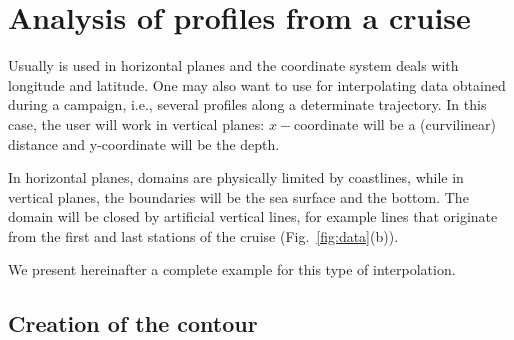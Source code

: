 

%
%








\section{Analysis of profiles from a cruise\label{sec:cruise}}

Usually \diva is used in horizontal planes and the coordinate system deals with longitude and latitude. One may also want to use \diva for interpolating data obtained during a campaign, i.e., several profiles along a determinate trajectory. In this case, the user will work in vertical planes: $x-$coordinate will be a (curvilinear) distance and y-coordinate will be the depth.

In horizontal planes, domains are physically limited by coastlines, while in vertical planes, the boundaries will be the sea surface and the bottom. The domain will be closed by artificial vertical lines, for example lines that originate from the first and last stations of the cruise (Fig.~\ref{fig:data}(b)).

We present hereinafter a complete example for this type of interpolation.


\subsection{Creation of the contour}

